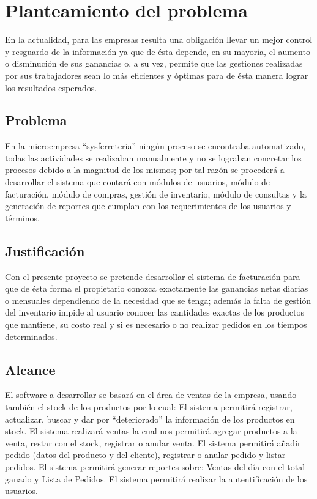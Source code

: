 \documentclass[preprint,12pt]{elsarticle}
\begin{document}
\section{Planteamiento del problema}
En la actualidad, para las empresas resulta una obligación llevar un mejor control y resguardo
de la información ya que de ésta depende, en su mayoría, el aumento o disminución de sus
ganancias o, a su vez, permite que las gestiones realizadas por sus trabajadores sean lo más
eficientes y óptimas para de ésta manera lograr los resultados esperados.

	\subsection{\textbf{Problema}}
 En la microempresa “sysferreteria” ningún proceso se encontraba automatizado, todas
las actividades se realizaban manualmente y no se lograban concretar los procesos debido a la
magnitud de los mismos; por tal razón se procederá a desarrollar el sistema que contará con
módulos de usuarios, módulo de facturación, módulo de compras, gestión de inventario, módulo
de consultas y la generación de reportes que cumplan con los requerimientos de los usuarios
 y términos.
	\subsection{\textbf{Justificación }}
Con el  presente proyecto  se pretende desarrollar el sistema de facturación para que de ésta forma el propietario conozca exactamente las ganancias netas diarias o mensuales
dependiendo de la necesidad que se tenga; además la falta de gestión del inventario impide al
usuario conocer las cantidades exactas de los productos que mantiene, su costo real y si es
necesario o no realizar pedidos en los tiempos determinados.

	\subsection{\textbf{ Alcance }}
El software a desarrollar se basará en el área de ventas de la empresa, usando también el stock de los productos por lo cual:
El sistema permitirá registrar, actualizar, buscar y dar por “deteriorado” la información de los productos en stock. 
El sistema realizará ventas la cual nos permitirá agregar productos a la venta, restar con el stock, registrar o anular venta. 
El sistema permitirá añadir pedido (datos del producto y del cliente), registrar o anular pedido y listar pedidos.
El sistema permitirá generar reportes sobre: Ventas del día con el total ganado y Lista de Pedidos.
El sistema permitirá realizar la autentificación de los usuarios.
\end{document}
